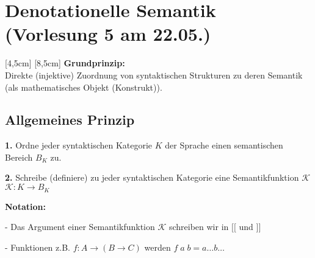 \section{Denotationelle Semantik \tiny (Vorlesung 5 am 22.05.)}
[4,5cm]
[8,5cm]
\textbf{Grundprinzip:} \\Direkte (injektive) Zuordnung von syntaktischen Strukturen zu deren Semantik (als mathematisches Objekt (Konstrukt)).
\subsection{Allgemeines Prinzip}
	\begin{compactitem}
		\item[\textbf{1.}] Ordne jeder syntaktischen Kategorie $K$ der Sprache einen semantischen Bereich $B_K$ zu.
		\item[\textbf{2.}] Schreibe (definiere) zu jeder syntaktischen Kategorie eine Semantikfunktion $\mathcal{K}$\\
		$\mathcal{K}:K \rightarrow B_K$
	\end{compactitem}
	\textbf{Notation:}
	\begin{compactitem}
		\item[-] Das Argument einer Semantikfunktion $\mathcal{K}$ schreiben wir in $
[\![$ und $]\!]$
		\item[-] Funktionen z.B. $f: A \rightarrow (B \rightarrow C)$ werden $f\;a\;b = a \dots b \dots $ 
	\end{compactitem}

